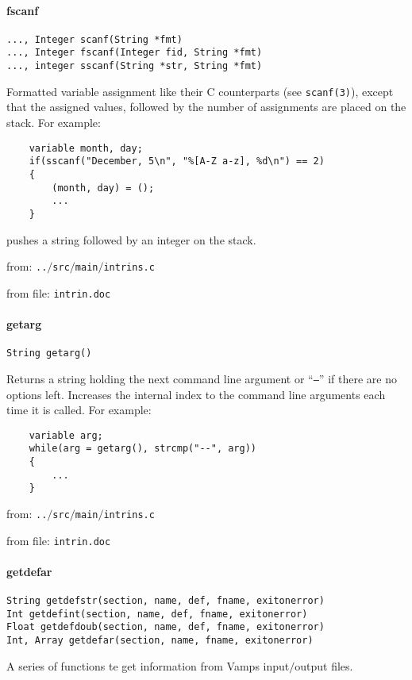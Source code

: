 \paragraph{fscanf}
\begin{verbatim}
..., Integer scanf(String *fmt)
..., Integer fscanf(Integer fid, String *fmt)
..., integer sscanf(String *str, String *fmt)
\end{verbatim}
Formatted variable assignment like their C counterparts
(see {\tt scanf(3)}), except that the assigned values, followed
by the number of assignments are placed on the stack. For
example:
\begin{verbatim}
    variable month, day;
    if(sscanf("December, 5\n", "%[A-Z a-z], %d\n") == 2)
    {
        (month, day) = ();
        ...
    }
\end{verbatim}
pushes a string followed by an integer on the stack.


from: {\tt ..$/$src$/$main$/$intrins.c}

from file: {\tt intrin.doc}


\paragraph{getarg}
\begin{verbatim}
String getarg()
\end{verbatim}
Returns a string holding the next command line argument or
``{\tt --}'' if there are no options left. Increases the internal
index to the command line arguments each time it is called.
For example:
\begin{verbatim}
    variable arg;
    while(arg = getarg(), strcmp("--", arg))
    {
        ...
    }
\end{verbatim}
from: {\tt ..$/$src$/$main$/$intrins.c}

from file: {\tt intrin.doc}


\paragraph{getdefar}
\begin{verbatim}
String getdefstr(section, name, def, fname, exitonerror)
Int getdefint(section, name, def, fname, exitonerror)
Float getdefdoub(section, name, def, fname, exitonerror)
Int, Array getdefar(section, name, fname, exitonerror)
\end{verbatim}
A series of functions te get information from Vamps input$/$output files.


